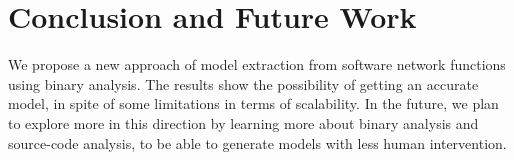 \section{Conclusion and Future Work}

We propose a new approach of model extraction from software network functions
using binary analysis. The results show the possibility of getting an accurate
model, in spite of some limitations in terms of scalability. In the future, we
plan to explore more in this direction by learning more about binary analysis
and source-code analysis, to be able to generate models with less human
intervention.


